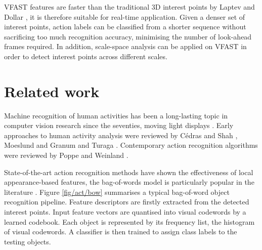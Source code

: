 VFAST features are faster than the traditional 3D interest points by Laptev \cite{Laptev2005} and Dollar \etal \cite{Dollar2005}, it is therefore suitable for real-time application. 
Given a denser set of interest points, action labels can be classified from a shorter sequence without sacrificing too much recognition accuracy, minimising the number of look-ahead frames required. 
In addition, scale-space analysis can be applied on VFAST in order to detect interest points across different scales.



\section{Related work}
\label{sec/act/relatedwork}

Machine recognition of human activities has been a long-lasting topic in computer vision research since the seventies, \eg moving light displays \cite{Johansson1973}. Early approaches to human activity analysis were reviewed by C\'edras and Shah \cite{Cedras1995}, Moeslund and Granum \cite{Moeslund2001} and Turaga \etal \cite{Turaga2008}. Contemporary action recognition algorithms were reviewed by Poppe \cite{Poppe2010} and Weinland \etal \cite{Weinland2011}.   

State-of-the-art action recognition methods have shown the effectiveness of local appearance-based features, the bag-of-words model is particularly popular in the literature \cite{Schuldt2004, Dollar2005, Riemenschneider2009, Niebles2008, Wong2007}.
Figure \ref{fig/act/bow} summarises a typical bag-of-word object recognition pipeline. Feature descriptors are firstly extracted from the detected interest points. Input feature vectors are quantised into visual codewords by a learned codebook. Each object is represented by its frequency list, \ie the histogram of visual codewords. A classifier is then trained to assign class labels to the testing objects.

